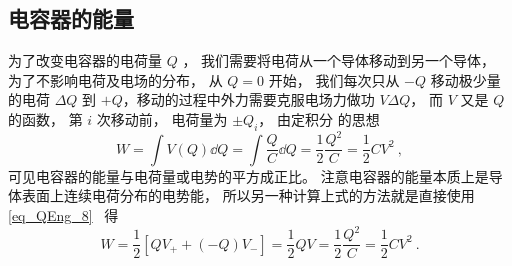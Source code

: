 \subsection{电容器的能量}
为了改变电容器的电荷量 $Q$ ， 我们需要将电荷从一个导体移动到另一个导体， 为了不影响电荷及电场的分布， 从 $Q = 0$ 开始， 我们每次只从 $-Q$ 移动极少量的电荷 $\Delta Q$ 到 $+Q$，移动的过程中外力需要克服电场力做功 $V\Delta Q$， 而 $V$ 又是 $Q$ 的函数， 第 $i$ 次移动前， 电荷量为 $\pm Q_i$， 由定积分 的思想
\begin{equation}
W = \int V(Q) \dd{Q} = \int \frac{Q}{C} \dd{Q} = \frac12 \frac{Q^2}{C} = \frac12 CV^2~,
\end{equation}
可见电容器的能量与电荷量或电势的平方成正比。 注意电容器的能量本质上是导体表面上连续电荷分布的电势能， 所以另一种计算上式的方法就是直接使用\autoref{eq_QEng_8}~ 得
\begin{equation}
W = \frac12 [QV_+ + (-Q)V_-] = \frac12 QV = \frac12 \frac{Q^2}{C} = \frac12 CV^2 ~.
\end{equation}
